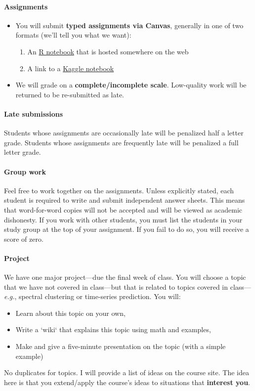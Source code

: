 \documentclass[10pt]{article}
\newcommand{\emf}[1]{\textbf{\textcolor{grass_green}{#1}}}
\begin{document}
\paragraph{Assignments}
\begin{itemize}
  \item You will submit \emf{typed assignments via Canvas}, generally in one of two formats (we'll tell you what we want):
  \begin{enumerate}
    \item An \href{https://www.rstudio.com/blog/r-notebooks/}{R notebook} that is hosted somewhere on the web
    \item A link to a \href{https://www.kaggle.com/docs/notebooks}{Kaggle notebook}
  \end{enumerate}
  \item We will grade on a \emf{complete/incomplete scale}. \newline Low-quality work will be returned to be re-submitted as late.
\end{itemize}

\paragraph{Late submissions} Students whose assignments are occasionally late will be penalized half a letter grade. Students whose assignments are frequently late will be penalized a full letter grade.

\paragraph{Group work} Feel free to work together on the assignments. Unless explicitly stated, each student is required to write and submit independent answer sheets. This means that word-for-word copies will not be accepted and will be viewed as academic dishonesty. If you work with other students, you must list the students in your study group at the top of your assignment. If you fail to do so, you will receive a score of zero.

\paragraph{Project} We have one major project---due the final week of class. You will choose a topic that we have not covered in class---but that is related to topics covered in class---\textit{e.g.}, spectral clustering or time-series prediction. You will:
\begin{itemize}
  \item Learn about this topic on your own,
  \item Write a `wiki` that explains this topic using math and examples,
  \item Make and give a five-minute presentation on the topic (with a simple example)
\end{itemize}
No duplicates for topics. I will provide a list of ideas on the course site. The idea here is that you extend/apply the course's ideas to situations that \textbf{interest you}.
\end{document}
